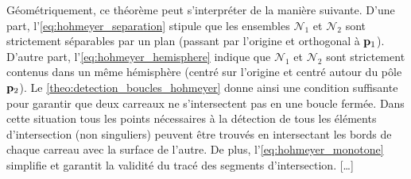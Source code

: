 Géométriquement, ce théorème peut s'interpréter de la manière suivante. 
D'une part, l'\autoref{eq:hohmeyer_separation} stipule que les ensembles $\mathcal{N}_1$ et $\mathcal{N}_2$ sont strictement séparables par un plan (passant par l'origine et orthogonal à $\mathbf{p}_1$). 
D'autre part, l'\autoref{eq:hohmeyer_hemisphere} indique que $\mathcal{N}_1$ et $\mathcal{N}_2$ sont strictement contenus dans un même hémisphère (centré sur l'origine et centré autour du pôle $\mathbf{p}_2$). 
Le \autoref{theo:detection_boucles_hohmeyer} donne ainsi une condition suffisante pour garantir que deux carreaux ne s'intersectent pas en une boucle fermée. 
Dans cette situation tous les points nécessaires à la détection de tous les éléments d'intersection (non singuliers) peuvent être trouvés en intersectant les bords de chaque carreau avec la surface de l'autre. 
De plus, l'\autoref{eq:hohmeyer_monotone} simplifie et garantit la validité du tracé des segments d'intersection. [\ldots]



